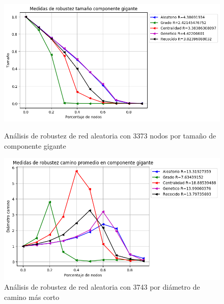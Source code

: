 \begin{figure}[!htb]
    \begin{minipage}{0.48\textwidth}
        \centering
        \includegraphics[scale=0.4]{CapituloAAnexos/imagenesAnexoC/Robustez/grafica_GC20180505_190832Random3373Nodes5978}
        \caption{Análisis de robustez de red aleatoria con 3373 nodos por tamaño de componente gigante}
    \end{minipage}\hfill
   \begin{minipage}{0.48\textwidth}
         \centering
       \includegraphics[scale=0.4]{CapituloAAnexos/imagenesAnexoC/Robustez/grafica_APL20180505_190832Random3373Nodes5978}
        \caption{Análisis de robustez de red aleatoria con 3743 por diámetro de camino más corto}
    \end{minipage}
\end{figure}

